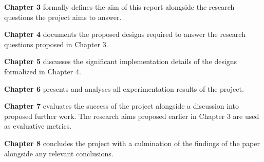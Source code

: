 \textbf{Chapter 3} formally defines the aim of this report alongside the research questions the project aims to answer.

\textbf{Chapter 4} documents the proposed designs required to answer the research questions proposed in Chapter 3.

\textbf{Chapter 5} discusses the significant implementation details of the designs formalized in Chapter 4.

\textbf{Chapter 6} presents and analyses all experimentation results of the project.

\textbf{Chapter 7} evaluates the success of the project alongside a discussion into proposed further work. The research aims proposed earlier in Chapter 3 are used as evaluative metrics.

\textbf{Chapter 8} concludes the project with a culmination of the findings of the paper alongside any relevant conclusions.